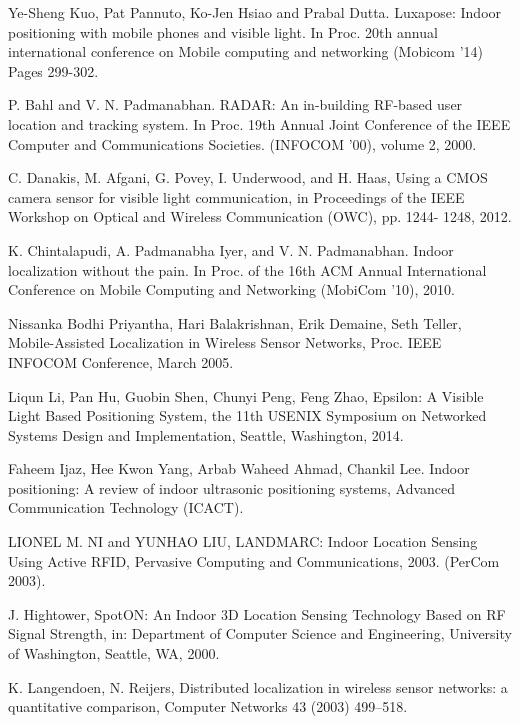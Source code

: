 \documentclass[conference]{IEEEtran}
\begin{document}
\begin{thebibliography}{1}

Ye-Sheng Kuo, Pat Pannuto, Ko-Jen Hsiao and Prabal Dutta. Luxapose: Indoor positioning with mobile phones and visible light. In Proc. 20th annual international conference on Mobile computing and networking (Mobicom ’14)
Pages 299-302.

P. Bahl and V. N. Padmanabhan. RADAR: An in-building
RF-based user location and tracking system. In Proc. 19th
Annual Joint Conference of the IEEE Computer and
Communications Societies. (INFOCOM ’00), volume 2, 2000.

C. Danakis, M. Afgani, G. Povey, I. Underwood, and H. Haas, Using a CMOS camera sensor for visible light
communication, in Proceedings of the IEEE Workshop on Optical and Wireless Communication (OWC), pp. 1244-
1248, 2012.

K. Chintalapudi, A. Padmanabha Iyer, and V. N.
Padmanabhan. Indoor localization without the pain. In Proc.
of the 16th ACM Annual International Conference on Mobile
Computing and Networking (MobiCom ’10), 2010.

Nissanka Bodhi Priyantha, Hari Balakrishnan, Erik Demaine, Seth Teller, Mobile-Assisted Localization in Wireless Sensor Networks, Proc. IEEE INFOCOM Conference, March 2005.

Liqun Li, Pan Hu, Guobin Shen, Chunyi Peng, Feng Zhao, Epsilon: A Visible Light Based Positioning System, the 11th USENIX Symposium on Networked Systems Design and Implementation, Seattle, Washington, 2014.

Faheem Ijaz, Hee Kwon Yang, Arbab Waheed Ahmad, Chankil Lee. Indoor positioning: A review of indoor ultrasonic positioning systems, Advanced Communication Technology (ICACT).


LIONEL M. NI and YUNHAO LIU, LANDMARC: Indoor Location Sensing Using Active RFID, Pervasive Computing and Communications, 2003. (PerCom 2003).

J. Hightower, SpotON: An Indoor 3D Location Sensing Technology Based on RF
Signal Strength, in: Department of Computer Science and Engineering,
University of Washington, Seattle, WA, 2000.

K. Langendoen, N. Reijers, Distributed localization in wireless sensor networks:
a quantitative comparison, Computer Networks 43 (2003) 499–518.


\end{thebibliography}
\end{document}
